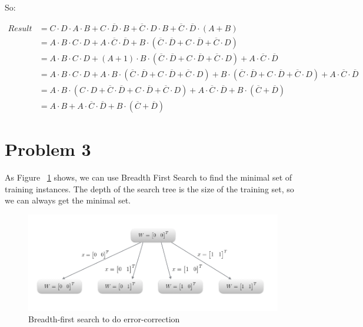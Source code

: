\documentclass[paper=a4, fontsize=11pt]{scrartcl} %
\numberwithin{equation}{section} %
\numberwithin{figure}{section} %
\numberwithin{table}{section} %
\begin{document}
So:

\begin{align*}
Result&= C \cdot D \cdot A \cdot B + 
         C \cdot \overline{D} \cdot B +
         \overline{C} \cdot D \cdot B +
         \overline{C} \cdot \overline{D} \cdot (A + B)\\
      &= A \cdot B \cdot C \cdot D + 
         A \cdot \overline{C} \cdot \overline{D} +
         B \cdot (\overline{C} \cdot \overline{D} + C \cdot \overline{D} + \overline{C} \cdot D)\\
      &= A \cdot B \cdot C \cdot D + 
         (A + 1) \cdot B \cdot (\overline{C} \cdot \overline{D} + C \cdot \overline{D} + \overline{C} \cdot D) +
         A \cdot \overline{C} \cdot \overline{D}\\
      &= A \cdot B \cdot C \cdot D + 
         A \cdot B \cdot (\overline{C} \cdot \overline{D} + C \cdot \overline{D} + \overline{C} \cdot D) +
         B \cdot (\overline{C} \cdot \overline{D} + C \cdot \overline{D} + \overline{C} \cdot D) +
         A \cdot \overline{C} \cdot \overline{D} \\
      &= A \cdot B \cdot (C \cdot D + \overline{C} \cdot \overline{D} + C \cdot \overline{D} + \overline{C} \cdot D) +
         A \cdot \overline{C} \cdot \overline{D} +
         B \cdot (\overline{C} + \overline{D})\\
      &= A \cdot B +
         A \cdot \overline{C} \cdot \overline{D} +
         B \cdot (\overline{C} + \overline{D}) 
\end{align*}



\section{Problem 3}

As Figure ~\ref{fig:Problem3.1} shows, we can use Breadth First Search to find the minimal set of training instances. 
The depth of the search tree is the size of the training set, so we can always get the minimal set.

\begin{figure}[h]
    \includegraphics[scale=0.5]{image5.png}
    \caption{Breadth-first search to do error-correction}
    \label{fig:Problem3.1}
\end{figure}
\end{document}
